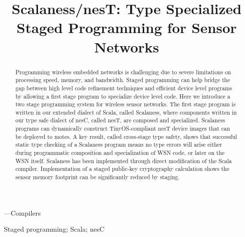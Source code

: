 
\setlength{\pdfpageheight}{\paperheight}
\setlength{\pdfpagewidth}{\paperwidth}



\exclusivelicense                %



\title{Scalaness/nesT: Type Specialized Staged Programming for Sensor Networks}


\maketitle

\begin{abstract}
  Programming wireless embedded networks is challenging due to severe limitations on processing
  speed, memory, and bandwidth. Staged programming can help bridge the gap between high level
  code refinement techniques and efficient device level programs by allowing a first stage
  program to specialize device level code. Here we introduce a two stage programming system for
  wireless sensor networks. The first stage program is written in our extended dialect of Scala,
  called Scalaness, where components written in our type safe dialect of nesC, called nesT, are
  composed and specialized. Scalaness programs can dynamically construct TinyOS-compliant nesT
  device images that can be deployed to motes. A key result, called cross-stage type safety,
  shows that successful static type checking of a Scalaness program means no type errors will
  arise either during programmatic composition and specialization of WSN code, or later on the
  WSN itself. Scalaness has been implemented through direct modification of the Scala compiler.
  Implementation of a staged public-key cryptography calculation shows the sensor memory
  footprint can be significantly reduced by staging.
\end{abstract}

---Compilers


\keywords
Staged programming; Scala; nesC

